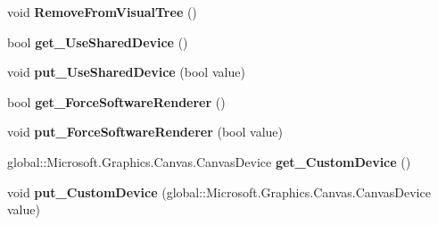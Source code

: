 \begin{DoxyCompactItemize}
\item 
\mbox{\label{interface_microsoft_1_1_graphics_1_1_canvas_1_1_u_i_1_1_xaml_1_1_i_canvas_control_a6782a4dab5ff0be4ad3f21faab9d1837}} 
void {\bfseries Remove\+From\+Visual\+Tree} ()
\item 
\mbox{\label{interface_microsoft_1_1_graphics_1_1_canvas_1_1_u_i_1_1_xaml_1_1_i_canvas_control_ab71cfd94041b0c62d1f905ee5fe200b9}} 
bool {\bfseries get\+\_\+\+Use\+Shared\+Device} ()
\item 
\mbox{\label{interface_microsoft_1_1_graphics_1_1_canvas_1_1_u_i_1_1_xaml_1_1_i_canvas_control_a66c9173d29e17dbbb7b5ef1b315bd7a8}} 
void {\bfseries put\+\_\+\+Use\+Shared\+Device} (bool value)
\item 
\mbox{\label{interface_microsoft_1_1_graphics_1_1_canvas_1_1_u_i_1_1_xaml_1_1_i_canvas_control_a62be2aa017fd1aa2d0100789a5dbd557}} 
bool {\bfseries get\+\_\+\+Force\+Software\+Renderer} ()
\item 
\mbox{\label{interface_microsoft_1_1_graphics_1_1_canvas_1_1_u_i_1_1_xaml_1_1_i_canvas_control_adb46fbfbe0e98392df3ff1ebdbfe650d}} 
void {\bfseries put\+\_\+\+Force\+Software\+Renderer} (bool value)
\item 
\mbox{\label{interface_microsoft_1_1_graphics_1_1_canvas_1_1_u_i_1_1_xaml_1_1_i_canvas_control_a662ab7bd653827c7b276b057e9eab211}} 
global\+::\+Microsoft.\+Graphics.\+Canvas.\+Canvas\+Device {\bfseries get\+\_\+\+Custom\+Device} ()
\item 
\mbox{\label{interface_microsoft_1_1_graphics_1_1_canvas_1_1_u_i_1_1_xaml_1_1_i_canvas_control_a4da1f97d13f825f768730d9598d88902}} 
void {\bfseries put\+\_\+\+Custom\+Device} (global\+::\+Microsoft.\+Graphics.\+Canvas.\+Canvas\+Device value)

\end{DoxyCompactItemize}
